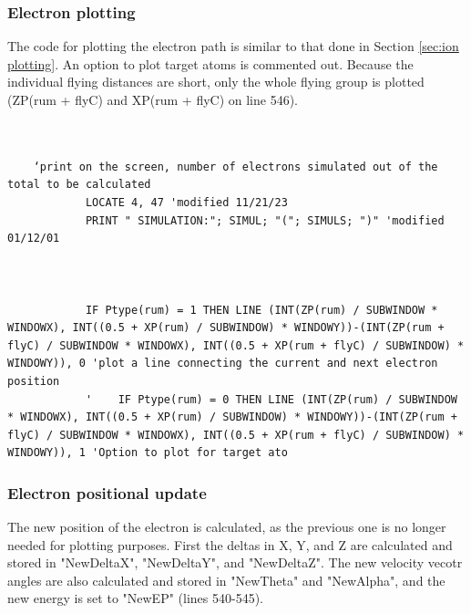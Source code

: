 \documentclass[10pt, reqno]{exam}
\begin{document}
\subsubsection{Electron plotting}

The code for plotting the electron path is similar to that done in Section \ref{sec:ion plotting}. An option to plot target atoms is commented out. Because the individual flying distances are short, only the whole flying group is plotted (ZP(rum + flyC) and XP(rum + flyC) on line 546).

\begin{verbatim}
    
    
    ‘print on the screen, number of electrons simulated out of the total to be calculated 
            LOCATE 4, 47 'modified 11/21/23
            PRINT " SIMULATION:"; SIMUL; "("; SIMULS; ")" 'modified 01/12/01
            
    
    
            IF Ptype(rum) = 1 THEN LINE (INT(ZP(rum) / SUBWINDOW * WINDOWX), INT((0.5 + XP(rum) / SUBWINDOW) * WINDOWY))-(INT(ZP(rum + flyC) / SUBWINDOW * WINDOWX), INT((0.5 + XP(rum + flyC) / SUBWINDOW) * WINDOWY)), 0 'plot a line connecting the current and next electron position
            '    IF Ptype(rum) = 0 THEN LINE (INT(ZP(rum) / SUBWINDOW * WINDOWX), INT((0.5 + XP(rum) / SUBWINDOW) * WINDOWY))-(INT(ZP(rum + flyC) / SUBWINDOW * WINDOWX), INT((0.5 + XP(rum + flyC) / SUBWINDOW) * WINDOWY)), 1 'Option to plot for target ato
\end{verbatim}

\subsubsection{Electron positional update}

The new position of the electron is calculated, as the previous one is no longer needed for plotting purposes. First the deltas in X, Y, and Z are calculated and stored in "NewDeltaX", "NewDeltaY", and "NewDeltaZ". The new velocity vecotr angles are also calculated and stored in "NewTheta" and "NewAlpha", and the new energy is set to "NewEP" (lines 540-545).
\end{document}
